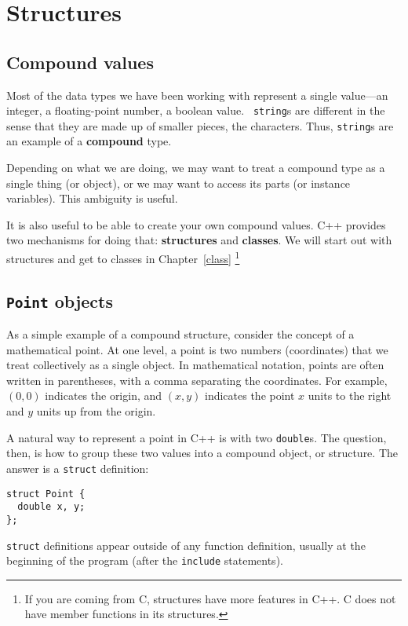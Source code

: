 

\chapter{Structures}
\label{structs}

\section{Compound values}

Most of the data types we have been working with represent a single
value---an integer, a floating-point number, a boolean value.  {\tt
string}s are different in the sense that they are made up of smaller
pieces, the characters.  Thus, {\tt string}s are an example of a
{\bf compound} type.

Depending on what we are doing, we may want to treat a compound type
as a single thing (or object), or we may want to access its parts (or
instance variables).  This ambiguity is useful.

It is also useful to be able to create your own compound values.  C++
provides two mechanisms for doing that: {\bf structures} and {\bf
classes}.  We will start out with structures and get to classes in
Chapter~\ref{class} \footnote{If you are coming from C, structures have more features in C++. C does not have member functions in its structures.}

\section{{\tt Point} objects}

As a simple example of a compound structure, consider the concept of a
mathematical point.  At one level, a point is two numbers
(coordinates) that we treat collectively as a single object.  In
mathematical notation, points are often written in parentheses, with a
comma separating the coordinates.  For example, $(0, 0)$ indicates the
origin, and $(x, y)$ indicates the point $x$ units to the right and
$y$ units up from the origin.

A natural way to represent a point in C++ is with two {\tt double}s.
The question, then, is how to group these two values into
a compound object, or structure.  The answer is a {\tt struct}
definition:

\begin{verbatim}
struct Point {
  double x, y;
};  
\end{verbatim}
%
{\tt struct} definitions appear outside of any function definition,
usually at the beginning of the program (after the {\tt include}
statements).

